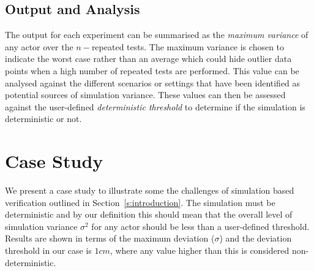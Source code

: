 \documentclass[letterpaper, 10 pt, journal, twoside]{IEEEtran}
\begin{document}

\subsection{Output and Analysis}
The output for each experiment can be summarised as the \textit{maximum variance} of any actor over the $n-$repeated tests. The maximum variance is chosen to indicate the worst case rather than an average which could hide outlier data points when a high number of repeated tests are performed. This value can be analysed against the different scenarios or settings that have been identified as potential sources of simulation variance. These values can then be assessed against the user-defined \textit{deterministic threshold} to determine if the simulation is deterministic or not. 




\section{Case Study} \label{s:case-study}
We present a case study to illustrate some the challenges of simulation based verification outlined in Section~\ref{s:introduction}. The simulation must be deterministic and by our definition this should mean that the overall level of simulation variance $\sigma^2$ for any actor should be less than a user-defined threshold. Results are shown in terms of the maximum deviation ($\sigma$) and the deviation threshold in our case is $1cm$, where any value higher than this is considered non-deterministic. 
\end{document}
